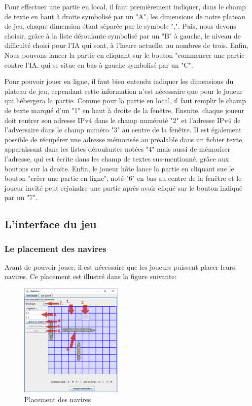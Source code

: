 		Pour effectuer une partie en local, il faut premièrement indiquer, dans le champ de texte en haut à droite symbolisé par un "A", les dimensions de notre plateau de jeu, chaque dimension étant séparée par le symbole ",". Puis, nous devons choisir, grâce à la liste déroulante symbolisé par un "B" à gauche, le niveau de difficulté choisi pour l'IA qui sont, à l'heure actuelle, au nombres de trois. Enfin, Nous pouvons lancer la partie en cliquant sur le bouton "commencer une partie contre l'IA, qui se situe en bas à gauche symbolisé par un "C".

		Pour pouvoir jouer en ligne, il faut bien entendu indiquer les dimensions du plateau de jeu, cependant cette information n'est nécessaire que pour le joueur qui hébergera la partie. Comme pour la partie en local, il faut remplir le champ de texte marqué d'un "1" en haut à droite de la fenêtre. Ensuite, chaque joueur doit rentrer son adresse IPv4 dans le champ numéroté "2" et l'adresse IPv4 de l'adversaire dans le champ numéro "3" au centre de la fenêtre. \newline
Il est également possible de récupérer une adresse mémorisée au préalable dans un fichier texte, apparaissant dans les listes déroulantes notées "4" mais aussi de mémoriser l'adresse, qui est écrite dans les champ de textes sus-mentionné, grâce aux boutons sur la droite.
\newline
Enfin, le joueur hôte lance la partie en cliquant sue le bouton "créer une partie en ligne", noté "6" en bas au centre de la fenêtre et le joueur invité peut rejoindre une partie après avoir cliqué sur le bouton indiqué par un "7".

\subsection{L'interface du jeu}
	\subsubsection{Le placement des navires}
		Avant de pouvoir jouer, il est nécessaire que les joueurs puissent placer leurs navires. Ce placement est illustré dans la figure suivante: \newline
		\begin{figure}[!h]
			\centering
			\includegraphics [width=5cm]{images/ship_placement.png}
			\caption{Placement des navires}
		\end{figure}
	
